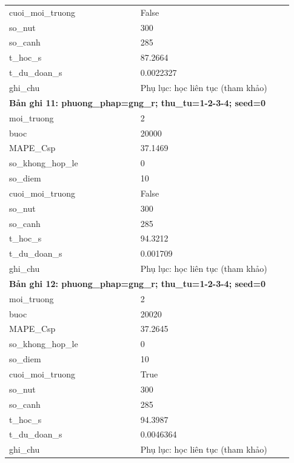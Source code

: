 \begin{longtable}{p{0.43\linewidth}p{0.50\linewidth}}
cuoi\_\allowbreak moi\_\allowbreak truong & False \\
so\_\allowbreak nut & 300 \\
so\_\allowbreak canh & 285 \\
t\_\allowbreak hoc\_\allowbreak s & 87.2664 \\
t\_\allowbreak du\_\allowbreak doan\_\allowbreak s & 0.0022327 \\
ghi\_\allowbreak chu & Phụ lục: học liên tục (tham khảo) \\
\midrule
\multicolumn{2}{p{0.95\linewidth}}{\textbf{Bản ghi 11: phuong\_phap=gng\_r; thu\_tu=1-2-3-4; seed=0}} \\
moi\_\allowbreak truong & 2 \\
buoc & 20000 \\
MAPE\_\allowbreak Csp & 37.1469 \\
so\_\allowbreak khong\_\allowbreak hop\_\allowbreak le & 0 \\
so\_\allowbreak diem & 10 \\
cuoi\_\allowbreak moi\_\allowbreak truong & False \\
so\_\allowbreak nut & 300 \\
so\_\allowbreak canh & 285 \\
t\_\allowbreak hoc\_\allowbreak s & 94.3212 \\
t\_\allowbreak du\_\allowbreak doan\_\allowbreak s & 0.001709 \\
ghi\_\allowbreak chu & Phụ lục: học liên tục (tham khảo) \\
\midrule
\multicolumn{2}{p{0.95\linewidth}}{\textbf{Bản ghi 12: phuong\_phap=gng\_r; thu\_tu=1-2-3-4; seed=0}} \\
moi\_\allowbreak truong & 2 \\
buoc & 20020 \\
MAPE\_\allowbreak Csp & 37.2645 \\
so\_\allowbreak khong\_\allowbreak hop\_\allowbreak le & 0 \\
so\_\allowbreak diem & 10 \\
cuoi\_\allowbreak moi\_\allowbreak truong & True \\
so\_\allowbreak nut & 300 \\
so\_\allowbreak canh & 285 \\
t\_\allowbreak hoc\_\allowbreak s & 94.3987 \\
t\_\allowbreak du\_\allowbreak doan\_\allowbreak s & 0.0046364 \\
ghi\_\allowbreak chu & Phụ lục: học liên tục (tham khảo) \\

\end{longtable}
